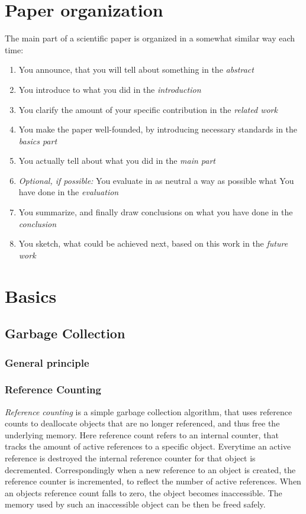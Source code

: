 \documentclass[twocolumn]{article}
\begin{document}

\section{Paper organization}
The main part of a scientific paper is organized in a somewhat similar way
each time:
\begin{enumerate}
\item You announce, that you will tell about something in the \emph{abstract}
\item You introduce to what you did in the \emph{introduction}
\item You clarify the amount of your specific contribution in the \emph{related work}
\item You make the paper well-founded, by introducing necessary standards in the \emph{basics part}
\item You actually tell about what you did in the \emph{main part}
\item \emph{Optional, if possible:} You evaluate in as neutral a way as possible what You have done in the \emph{evaluation}
\item You summarize, and finally draw conclusions on what you have done in the \emph{conclusion}
\item You sketch, what could be achieved next, based on this work in the \emph{future work}
\end{enumerate}

\section{Basics}
\subsection{Garbage Collection}
\subsubsection{General principle}
\subsubsection{Reference Counting}
\textit{Reference counting} is a simple garbage collection algorithm, that uses reference counts to deallocate objects that are no longer referenced, and thus free the underlying memory. Here reference count refers to an internal counter, that tracks the amount of active references to a specific object. Everytime an active reference is destroyed the internal reference counter for that object is decremented. Correspondingly when a new reference to an object is created, the reference counter is incremented, to reflect the number of active references. When an objects reference count falls to zero, the object becomes inaccessible. The memory used by such an inaccessible object can be then be freed safely.
\end{document}
